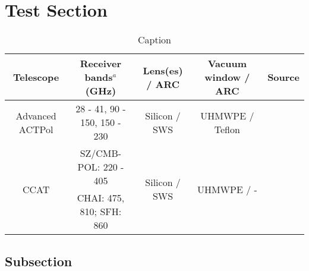
\section{Test Section}
\label{sec:section}

\begin{table}[t]
\begin{adjustbox}{width=1\textwidth,center}
\begin{tabular}{|c|c|c|c|c|}
\hline
\bf{Telescope} & \bf{ Receiver bands$^{a}$ (GHz)} & \bf{Lens(es) / ARC} & \bf{Vacuum window / ARC}  & \bf{Source}\\ \hline
 Advanced ACTPol & 28 - 41, 90 - 150, 150 - 230 & Silicon / SWS & UHMWPE / Teflon & \cite{ep3}\\ \hline
   \multirow{2}{*}{ CCAT} & SZ/CMB-POL: 220 - 405   &  \multirow{2}{*}{Silicon / SWS} &   \multirow{2}{*}{UHMWPE / -} &  \multirow{2}{*}{\cite{}}\\ 
                                   & CHAI: 475, 810; SFH: 860  &  & & \\ \hline
\end{tabular}
\end{adjustbox}
\vspace{-0.13in}
\caption{ \small \setlength{\baselineskip}{0.95\baselineskip}
Caption
\label{tab:msmreceivers} }
\vspace{-0.05in}
\end{table}

\subsection{Subsection}



 

